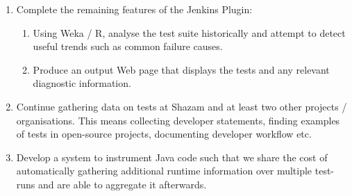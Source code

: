 \begin{enumerate}

	\item Complete the remaining features of the Jenkins Plugin:
	\begin{enumerate}

		\item Using Weka / R, analyse the test suite historically and attempt to
		detect useful trends such as common failure causes.
		\item Produce an output Web page that displays the \flaky tests and any
		relevant diagnostic information.

	\end{enumerate}
	\item Continue gathering data on \flaky tests at Shazam and at least two other
	projects / organisations. This means collecting developer statements, finding
	examples of \flaky tests in open-source projects, documenting developer
	workflow etc.
	\item Develop a system to instrument Java code such that we share the cost of
	automatically gathering additional runtime information over multiple test-runs
	and are able to aggregate it afterwards.

\end{enumerate}

\newpage

\setcounter{section}{\value{oldSectionCounter}}
\setcounter{subsection}{\value{oldSubSectionCounter}}
\setcounter{page}{\value{oldPageCounter}}
